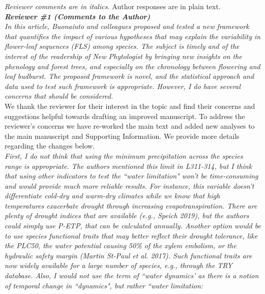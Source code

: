 \documentclass{article}[11pt]
\begin{document}
\setlength\parindent{0pt}



\emph{Reviewer comments are in italics.} Author responses are in plain text.\\


\emph{{\bf Reviewer \#1 (Comments to the Author)}}\\

\emph{In this article, Buonaiuto and colleagues proposed and tested a new framework that quantifies the impact of various hypotheses that may explain the variability in flower-leaf sequences (FLS) among species. The subject is timely and of the interest of the readership of New Phytologist by bringing new insights on the phenology and forest trees, and especially on the chronology between flowering and leaf budburst. The proposed framework is novel, and the statistical approach and data used to test such framework is appropriate. However, I do have several concerns that should be considered.}\\

We thank the reviewer for their interest in the topic and find their concerns and suggestions helpful towards drafting an improved manuscript. To address the reviewer's concerns we have re-worked the main text and added new analyses to the main manuscript and Supporting Information. We provide more details regarding the changes below.\\

\emph{First, I do not think that using the minimum precipitation across the species range is appropriate. The authors mentioned this limit in L311-314, but I think that using other indicators to test the ``water limitation" won't be time-consuming and would provide much more reliable results. For instance, this variable doesn't differentiate cold-dry and warm-dry climates while we know that high temperatures exacerbate drought through increasing evapotranspiration. There are plenty of drought indices that are available (e.g., Speich 2019), but the authors could simply use P-ETP, that can be calculated annually. Another option would be to use species functional traits that may better reflect their drought tolerance, like the PLC50, the water potential causing 50\% of the xylem embolism, or the hydraulic safety margin (Martin St-Paul et al. 2017). Such functional traits are now widely available for a large number of species, e.g., through the TRY database. Also, I would not use the term of ``water dynamics' as there is a notion of temporal change in ``dynamics", but rather ``water limitation:}\\
\end{document}
